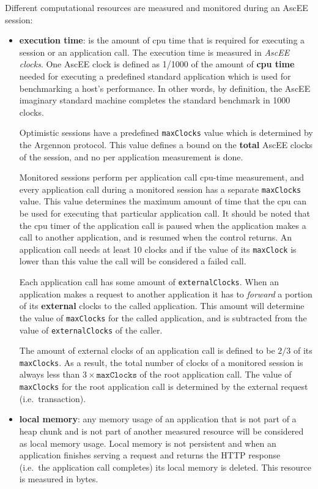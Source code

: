 Different computational resources are measured and monitored during an AscEE session:
\begin{itemize}
    \item \textbf{execution time}:
    is the amount of cpu time that is required for executing a session or an application call. The execution time is
    measured in \emph{AscEE clocks}. One AscEE clock is defined as 1/1000 of the amount
    of \textbf{cpu time} needed for executing a predefined standard application which is used for benchmarking a host's
    performance. In other words, by definition, the AscEE imaginary standard machine completes the standard benchmark
    in 1000 clocks.

    Optimistic sessions have a predefined \texttt{maxClocks} value which is determined by the Argennon protocol. This
    value defines a bound on the \textbf{total} AscEE clocks of the session, and no per application measurement is done.

    Monitored sessions perform per application call cpu-time measurement, and every application call during a monitored
    session has a separate \texttt{maxClocks} value. This value determines the maximum amount of time that the cpu
    can be used for executing that particular application call. It should be noted that the cpu timer of the
    application call is paused when the application makes a call to another application, and is resumed when the
    control returns. An application call
    needs at least 10 clocks and if the value of its \texttt{maxClock} is lower than this value the call will be
    considered a failed call.

    Each application call has some amount of \texttt{externalClocks}. When an application makes a request to another
    application it has to \emph{forward} a portion of its \textbf{external} clocks to the called application. This
    amount will determine the value of \texttt{maxClocks} for the called application, and is subtracted from the value
    of \texttt{externalClocks} of the caller.

    The amount of external clocks of an application
    call is defined to be \(2/3\) of its \texttt{maxClocks}. As a result, the total number of clocks of a monitored
    session is always less than \(3 \times \texttt{maxClocks}\) of the root application call. The value of
    \texttt{maxClocks} for
    the root application call is determined by the external request (i.e.\ transaction).

    \item \textbf{local memory}:
    any memory usage of an application that is not part of a heap chunk and is not part of another measured resource
    will be considered as local memory usage. Local memory is not persistent and when an application finishes serving a
    request and returns the HTTP response (i.e.\ the application call completes) its local memory is deleted.
    This resource is measured in bytes.


\end{itemize}
